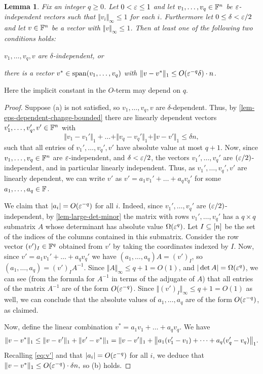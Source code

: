 \documentclass{daj}
\theoremstyle{plain}
\theoremstyle{plain}
\newtheorem{lem}[thm]{Lemma}
\theoremstyle{plain}
\theoremstyle{plain}
\theoremstyle{definition}
\theoremstyle{plain}
\theoremstyle{plain}
\theoremstyle{definition}
\theoremstyle{definition}
\theoremstyle{plain}
\let\originalleft\left
\let\originalright\right
\renewcommand{\left}{\mathopen{}\mathclose\bgroup\originalleft}
\renewcommand{\right}{\aftergroup\egroup\originalright}
\begin{document}
\begin{lem}\label{lem-indep-or-close-lin-comb}
Fix an integer $q\geq 0$. Let $0<\varepsilon\leq 1$ and let $v_1,\dots,v_q\in \mathbb{F}^n$ be $\varepsilon$-independent vectors such that $\Vert v_i\Vert_\infty\le 1$ for each $i$. Furthermore let $0\leq\delta<\varepsilon/2$ and let $v\in \mathbb{F}^n$ be a vector with $\Vert v\Vert_\infty\le 1$. Then at least one of the following two conditions holds:
\begin{compactitem}
\item[(a)] $v_1,\dots, v_q,v$ are $\delta$-independent, or
\item[(b)] there is a vector $v^*\in \operatorname{span}(v_1,\dots,v_q)$ with $\Vert v-v^*\Vert_1\leq O(\varepsilon^{-q}\delta)\cdot n$.
\end{compactitem}
\end{lem}
Here the implicit constant in the $O$-term may depend on $q$.
\begin{proof}
Suppose (a) is not satisfied, so $v_1,\dots, v_q,v$ are $\delta$-dependent. Thus, by \cref{lem-eps-dependent-change-bounded} there are linearly dependent vectors $v_1',\dots,v_q',v'\in \mathbb{F}^n$ with
\begin{equation}\Vert v_1-v_1'\Vert_1+\dots +\Vert v_q-v_q'\Vert_1+\Vert v-v'\Vert_1\leq \delta n,\label{eq:v'}\end{equation}
such that all entries of $v_1',\dots,v_q', v'$ have absolute value at most $q+1$. Now, since $v_1,\dots,v_q\in \mathbb{F}^n$ are $\varepsilon$-independent, and $\delta<\varepsilon/2$, the vectors $v_1',\dots,v_q'$ are $(\varepsilon/2)$-independent, and in particular linearly independent. Thus, as $v_1',\dots,v_q', v'$ are linearly dependent, we can write $v'$ as $v'=a_1v_1'+\dots+a_qv_q'$ for some $a_1,\dots,a_q\in \mathbb{F}$.

We claim that $\vert a_i\vert=O(\varepsilon^{-q})$ for all $i$. Indeed, since $v_1',\dots,v_q'$ are $(\varepsilon/2)$-independent, by \cref{lem-large-det-minor} the matrix with rows $v_1',\dots,v_q'$ has a $q\times q$ submatrix $A$ whose determinant has absolute value $\Omega(\varepsilon^q)$. Let $I\subseteq [n]$ be the set of the indices of the columns contained in this submatrix. Consider the row vector $(v')_I\in \mathbb{F}^q$ obtained from $v'$ by taking the coordinates indexed by $I$. Now, since $v'=a_1v_1'+\dots+a_qv_q'$ we have $(a_1,\dots,a_q)A=(v')_I$, so $(a_1,\dots,a_q)=(v')_IA^{-1}$. Since $\Vert A\Vert_\infty\le q+1=O(1)$, and $\vert\det A\vert =\Omega(\varepsilon^q)$, we can see (from the formula for $A^{-1}$ in terms of the adjugate of $A$) that all entries of the matrix $A^{-1}$ are of the form $O(\varepsilon^{-q})$. Since $\Vert (v')_I\Vert_\infty\le q+1=O(1)$ as well, we can conclude that the absolute values of $a_1,\dots,a_q$ are of the form $O(\varepsilon^{-q})$, as claimed.

Now, define the linear combination $v^*=a_1v_1+\dots+a_qv_q$. We have
\[
\Vert v-v^*\Vert_1\leq\Vert v-v'\Vert_1+\Vert v'-v^*\Vert_1=\Vert v-v'\Vert_1+\left\Vert a_1(v_1'-v_1)+\dots+a_q(v_q'-v_q)\right\Vert_1.\]
Recalling \cref{eq:v'} and that $\vert a_i\vert=O(\varepsilon^{-q})$ for all $i$, we deduce that $\Vert v-v^*\Vert_1\le O(\varepsilon^{-q})\cdot\delta n,
$
so (b) holds.
\end{proof}
\end{document}
